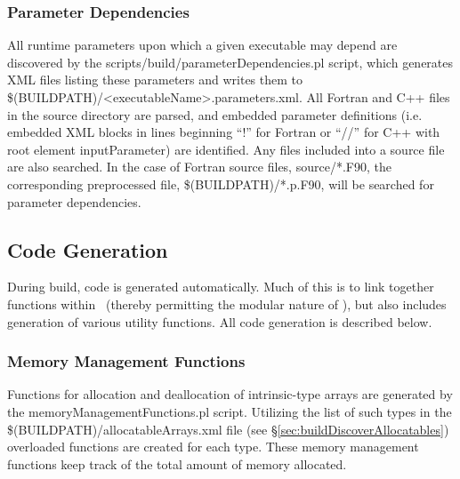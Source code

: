 \subsubsection{Parameter Dependencies}\label{sec:parameterDependencies}

All runtime parameters upon which a given executable may depend are discovered by the {\normalfont \ttfamily scripts/build/parameterDependencies.pl} script, which generates XML files listing these parameters and writes them to {\normalfont \ttfamily \$(BUILDPATH)/\textless executableName\textgreater.parameters.xml}. All Fortran and C++ files in the {\normalfont \ttfamily source} directory are parsed, and embedded parameter definitions (i.e. embedded XML blocks in lines beginning ``!\@'' for Fortran or ``//\@'' for C++ with root element {\normalfont \ttfamily inputParameter}) are identified. Any files included into a source file are also searched. In the case of Fortran source files, {\normalfont \ttfamily source/*.F90}, the corresponding preprocessed file, {\normalfont \ttfamily \$(BUILDPATH)/*.p.F90}, will be searched for parameter dependencies.

\subsection{Code Generation}

During build, code is generated automatically. Much of this is to link together functions within \glc\ (thereby permitting the modular nature of \glc), but also includes generation of various utility functions. All code generation is described below.

\subsubsection{Memory Management Functions}\label{sec:buildGenerationMemory}

Functions for allocation and deallocation of intrinsic-type arrays are generated by the {\normalfont \ttfamily memoryManagementFunctions.pl} script. Utilizing the list of such types in the {\normalfont \ttfamily \$(BUILDPATH)/allocatableArrays.xml} file (see \S\ref{sec:buildDiscoverAllocatables}) overloaded functions are created for each type. These memory management functions keep track of the total amount of memory allocated.

